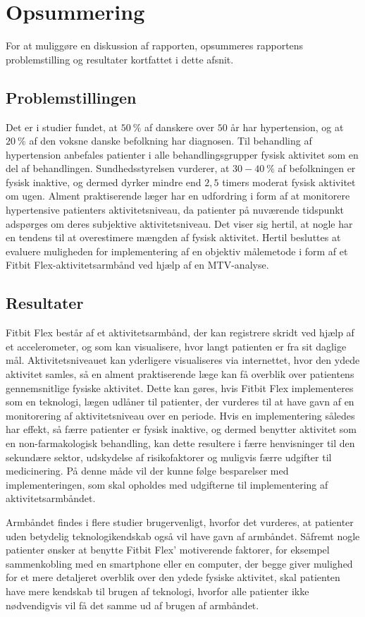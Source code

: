 \section{Opsummering}
For at muliggøre en diskussion af rapporten, opsummeres rapportens problemstilling og resultater kortfattet i dette afsnit. 
\subsection{Problemstillingen}
Det er i studier fundet, at $50~\%$ af danskere over $50$ år har hypertension, og at $20~\%$ af den voksne danske befolkning har diagnosen. Til behandling af hypertension anbefales patienter i alle behandlingsgrupper fysisk aktivitet som en del af behandlingen. Sundhedsstyrelsen vurderer, at $30-40~\%$ af befolkningen er fysisk inaktive, og dermed dyrker mindre end $2,5$ timers moderat fysisk aktivitet om ugen. Alment praktiserende læger har en udfordring i form af at monitorere hypertensive patienters aktivitetsniveau, da patienter på nuværende tidspunkt adspørges om deres subjektive aktivitetsniveau. Det viser sig hertil, at nogle har en tendens til at overestimere mængden af fysisk aktivitet. Hertil besluttes at evaluere muligheden for implementering af en objektiv målemetode i form af et Fitbit Flex-aktivitetsarmbånd ved hjælp af en MTV-analyse. 
\subsection{Resultater}
Fitbit Flex består af et aktivitetsarmbånd, der kan registrere skridt ved hjælp af et accelerometer, og som kan visualisere, hvor langt patienten er fra sit daglige mål. Aktivitetsniveauet kan yderligere visualiseres via internettet, hvor den ydede aktivitet samles, så en alment praktiserende læge kan få overblik over patientens gennemsnitlige fysiske aktivitet. Dette kan gøres, hvis Fitbit Flex implementeres som en teknologi, lægen udlåner til patienter, der vurderes til at have gavn af en monitorering af aktivitetsniveau over en periode. Hvis en implementering således har effekt, så færre patienter er fysisk inaktive, og dermed benytter aktivitet som en non-farmakologisk behandling, kan dette resultere i færre henvisninger til den sekundære sektor, udskydelse af risikofaktorer og muligvis færre udgifter til medicinering. På denne måde vil der kunne følge besparelser med implementeringen, som skal opholdes med udgifterne til implementering af aktivitetsarmbåndet. 

Armbåndet findes i flere studier brugervenligt, hvorfor det vurderes, at patienter uden betydelig teknologikendskab også vil have gavn af armbåndet. Såfremt nogle patienter ønsker at benytte Fitbit Flex' motiverende faktorer, for eksempel sammenkobling med en smartphone eller en computer, der begge giver mulighed for et mere detaljeret overblik over den ydede fysiske aktivitet, skal patienten have mere kendskab til brugen af teknologi, hvorfor alle patienter ikke nødvendigvis vil få det samme ud af brugen af armbåndet.